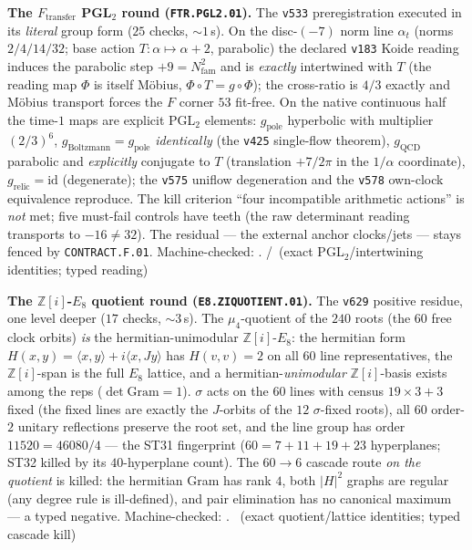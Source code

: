 \documentclass[11pt,a4paper]{article}
\theoremstyle{definition}
\begin{document}
\par\smallskip\noindent\textbf{The $F_{\mathrm{transfer}}$ PGL$_2$ round
(\texttt{FTR.PGL2.01}).}
The \texttt{v533} preregistration executed in its \emph{literal} group
form ($25$ checks, ${\sim}1$\,s).  On the disc-$(-7)$ norm line
$\alpha_t$ (norms $2/4/14/32$; base action $T:\alpha\mapsto\alpha+2$,
parabolic) the declared \texttt{v183} Koide reading induces the
parabolic step $+9=N_{\mathrm{fam}}^2$ and is \emph{exactly}
intertwined with $T$ (the reading map $\Phi$ is itself M\"obius,
$\Phi\circ T=g\circ\Phi$); the cross-ratio is $4/3$ exactly and
M\"obius transport forces the $F$ corner $53$ fit-free.  On the native
continuous half the time-$1$ maps are explicit PGL$_2$ elements:
$g_{\mathrm{pole}}$ hyperbolic with multiplier $(2/3)^6$,
$g_{\mathrm{Boltzmann}}=g_{\mathrm{pole}}$ \emph{identically} (the
\texttt{v425} single-flow theorem), $g_{\mathrm{QCD}}$ parabolic and
\emph{explicitly} conjugate to $T$ (translation $+7/2\pi$ in the
$1/\alpha$ coordinate), $g_{\mathrm{relic}}=\mathrm{id}$ (degenerate);
the \texttt{v575} uniflow degeneration and the \texttt{v578} own-clock
equivalence reproduce.  The kill criterion ``four incompatible
arithmetic actions'' is \emph{not} met; five must-fail controls have
teeth (the raw determinant reading transports to $-16\ne32$).  The
residual --- the external anchor clocks/jets --- stays fenced by
\texttt{CONTRACT.F.01}.
Machine-checked: .
\mE/\mC\ (exact PGL$_2$/intertwining identities; typed reading)
\par\smallskip

\par\smallskip\noindent\textbf{The $\mathbb Z[i]$-$E_8$ quotient round
(\texttt{E8.ZIQUOTIENT.01}).}
The \texttt{v629} positive residue, one level deeper ($17$ checks,
${\sim}3$\,s).  The $\mu_4$-quotient of the $240$ roots (the $60$ free
clock orbits) \emph{is} the hermitian-unimodular $\mathbb Z[i]$-$E_8$:
the hermitian form $H(x,y)=\langle x,y\rangle+i\langle x,Jy\rangle$
has $H(v,v)=2$ on all $60$ line representatives, the
$\mathbb Z[i]$-span is the full $E_8$ lattice, and a
hermitian-\emph{unimodular} $\mathbb Z[i]$-basis exists among the reps
($\det\mathrm{Gram}=1$).  $\sigma$ acts on the $60$ lines with census
$19\times3+3$ fixed (the fixed lines are exactly the $J$-orbits of the
$12$ $\sigma$-fixed roots), all $60$ order-$2$ unitary reflections
preserve the root set, and the line group has order $11520=46080/4$
--- the ST31 fingerprint ($60=7{+}11{+}19{+}23$ hyperplanes; ST32
killed by its $40$-hyperplane count).  The $60\to6$ cascade route
\emph{on the quotient} is killed: the hermitian Gram has rank $4$,
both $|H|^2$ graphs are regular (any degree rule is ill-defined), and
pair elimination has no canonical maximum --- a typed negative.
Machine-checked: .
\mE\ (exact quotient/lattice identities; typed cascade kill)
\par\smallskip
\end{document}
